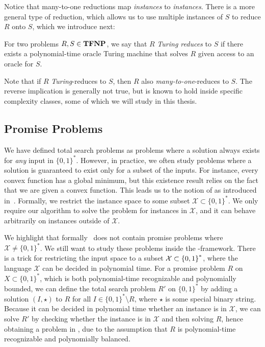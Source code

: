 Notice that many-to-one reductions map \emph{instances} to \emph{instances}. There is a more general type of reduction, which allows us to use multiple instances of $S$ to reduce $R$ onto $S$, which we introduce next:

\begin{definition}
	For two problems $R, S \in \textbf{TFNP}$, we say that $R$ \emph{Turing reduces} to $S$ if there exists a polynomial-time oracle Turing machine that solves $R$ given access to an oracle for $S$.
\end{definition}

Note that if $R$ \emph{Turing}-reduces to $S$, then $R$ also \emph{many-to-one}-reduces to $S$. The reverse implication is generally not true, but is known to hold inside specific complexity classes, some of which we will study in this thesis.

\subsection{Promise Problems}\label{sec:promise_problems}

We have defined total search problems as problems where a solution always exists for \emph{any} input in ${\{0, 1\}}^*$. However, in practice, we often study problems where a solution is guaranteed to exist only for a subset of the inputs. For instance, every convex function has a global minimum, but this existence result relies on the fact that we are given a convex function. This leads us to the notion of  as introduced in~. Formally, we restrict the instance space to some subset $\mathcal{X} \subset {\{0, 1\}}^*$. We only require our algorithm to solve the problem for instances in $\mathcal{X}$, and it can behave arbitrarily on instances outside of $\mathcal{X}$.

We highlight that formally \TFNP\ does not contain promise problems where $\mathcal{X} \neq {\{0, 1\}}^*$. We still want to study these problems inside the \TFNP-framework. There is a trick for restricting the input space to a subset $\mathcal{X} \subset \left\{0, 1\right\}^*$, where the language $\mathcal{X}$ can be decided in polynomial time. For a promise problem $R$ on $X \subset {\{0, 1\}}^*$, which is both polynomial-time recognizable and polynomially bounded, we can define the total search problem $R'$ on ${\{0, 1\}}^*$ by adding a solution $(I, \star)$ to $R$ for all $I \in {\{0, 1\}}^* \setminus R$, where $\star$ is some special binary string. Because it can be decided in polynomial time whether an instance is in $\mathcal{X}$, we can solve $R'$ by checking whether the instance is in $\mathcal{X}$ and then solving $R$, hence obtaining a problem in \TFNP, due to the assumption that $R$ is polynomial-time recognizable and polynomially balanced.

